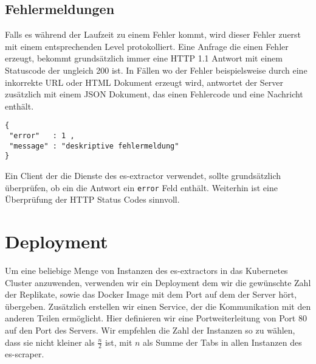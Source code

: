 \subsection{Fehlermeldungen}
Falls es während der Laufzeit zu einem Fehler kommt, wird dieser Fehler zuerst mit einem entsprechenden Level protokolliert. Eine Anfrage die einen Fehler erzeugt, bekommt grundsätzlich immer eine HTTP 1.1 Antwort mit einem Statuscode der ungleich 200 ist. In Fällen wo der Fehler beispielsweise durch eine inkorrekte URL oder HTML Dokument erzeugt wird, antwortet der Server zusätzlich mit einem JSON Dokument, das einen Fehlercode und eine Nachricht enthält.
\begin{verbatim}
{
 "error"   : 1 , 
 "message" : "deskriptive fehlermeldung"
}
\end{verbatim}
Ein Client der die Dienste des es-extractor verwendet, sollte grundsätzlich überprüfen, ob ein die Antwort ein \verb|error| Feld enthält. Weiterhin ist eine Überprüfung der HTTP Status Codes sinnvoll.

\section{Deployment}
Um eine beliebige Menge von Instanzen des es-extractors in das Kubernetes Cluster anzuwenden, verwenden wir ein Deployment dem wir die gewünschte Zahl der Replikate, sowie das Docker Image mit dem Port auf dem der Server hört, übergeben. Zusätzlich erstellen wir einen Service, der die Kommunikation mit den anderen Teilen ermöglicht. Hier definieren wir eine Portweiterleitung von Port 80 auf den Port des Servers. Wir empfehlen die Zahl der Instanzen so zu wählen, dass sie nicht kleiner als $\frac{n}{2}$ ist, mit $n$ als Summe der Tabs in allen Instanzen des es-scraper.














